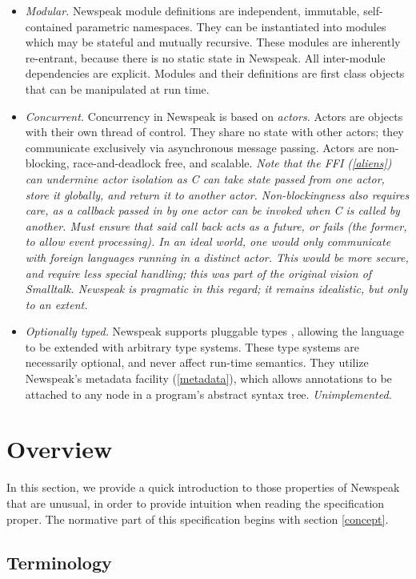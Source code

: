 \documentclass{article}
\begin{document}
\begin{itemize}
\item  {\em Modular.} Newspeak module definitions are independent, immutable, self-contained parametric namespaces.  They can be instantiated into modules which may be stateful and mutually recursive. These modules are inherently re-entrant, because there is no static state in Newspeak.  All inter-module dependencies are explicit. Modules and their definitions are first class objects that can be manipulated at run time.
\item  {\em Concurrent.}  Concurrency  in Newspeak is based on {\em actors.} Actors are objects with their own thread of control. They share no state with other actors; they communicate exclusively via asynchronous message passing. Actors are non-blocking, race-and-deadlock free, and scalable.
{\it Note that the FFI (\ref{aliens}) can undermine actor isolation as C can take state passed from one actor, store it globally, and return it to another actor. Non-blockingness also requires care, as a callback passed in by one actor can be invoked when C is called by another. Must ensure that said call back acts as a future, or  fails (the former, to allow event processing). In an ideal world, one would only communicate with foreign languages running in a distinct actor. This would be more secure, and require less special handling; this was part of the original vision of Smalltalk.  Newspeak is pragmatic in this regard; it remains idealistic, but only to an extent.
}
\item  {\em Optionally typed.} Newspeak supports pluggable types \cite{bracha04b}, allowing the language to be extended with arbitrary type systems.  These type systems are necessarily optional, and never affect run-time semantics. They utilize Newspeak's metadata facility (\ref{metadata}), which allows annotations to be attached to any node in a program's abstract syntax tree.
{\it Unimplemented.}
\end{itemize}

\section{Overview}

In this section, we provide a quick introduction to those properties of Newspeak that are unusual, in
order to provide intuition when reading the specification proper. The normative part of this specification  begins with section \ref{concept}. 

\subsection{Terminology}
\end{document}
